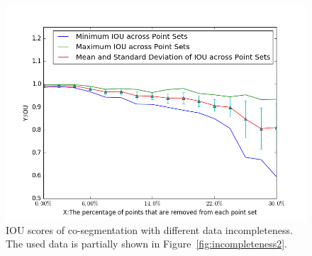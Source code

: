 \begin{figure}
	\centering
	\includegraphics[width=\linewidth]{images/incompleteness/IOU.png}
	\caption{IOU scores of co-segmentation with different data incompleteness. The used data is partially shown in Figure~\ref{fig:incompleteness2}.}
	\label{fig:incompleteness}
\end{figure}
